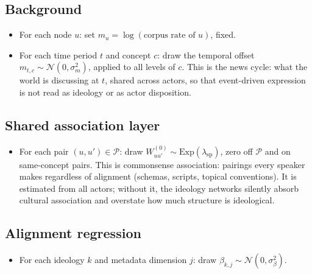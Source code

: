 \documentclass[11pt]{article}
\newcommand{\PP}{\mathcal{P}}
\newcommand{\1}{\mathbb{1}}
\begin{document}
\subsection*{Background}
\begin{itemize}
  \item For each node $u$: set $m_u=\log(\text{corpus rate of }u)$, fixed.
  \item For each time period $t$ and concept $c$: draw the temporal offset $m_{t,c}\sim\mathcal{N}(0,\sigma_m^2)$, applied to all levels of $c$. This is the news cycle: what the world is discussing at $t$, shared across actors, so that event-driven expression is not read as ideology or as actor disposition.
\end{itemize}

\subsection*{Shared association layer}
\begin{itemize}
  \item For each pair $(u,u')\in\PP$: draw $W^{(0)}_{uu'}\sim\text{Exp}(\lambda_{\text{sp}})$, zero off $\PP$ and on same-concept pairs. This is commonsense association: pairings every speaker makes regardless of alignment (schemas, scripts, topical conventions). It is estimated from all actors; without it, the ideology networks silently absorb cultural association and overstate how much structure is ideological.
\end{itemize}

\subsection*{Alignment regression}
\begin{itemize}
  \item For each ideology $k$ and metadata dimension $j$: draw $\beta_{k,j}\sim\mathcal{N}(0,\sigma_\beta^2)$.
\end{itemize}
\end{document}
